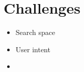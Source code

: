 \section{Challenges}
\label{sec:challenges}

\begin{itemize}
\item Search space
\item User intent
  \item 
\end{itemize}


